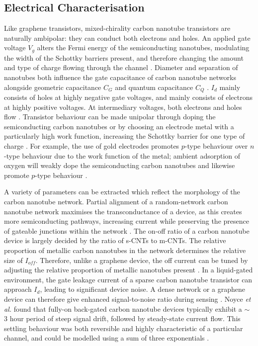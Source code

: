\documentclass[
  a4paper,
]{scrbook}
\begin{document}
\hypertarget{sec-electrical-characterisation-CNT}{%
\subsection{Electrical
Characterisation}\label{sec-electrical-characterisation-CNT}}

Like graphene transistors, mixed-chirality carbon nanotube transistors
are naturally ambipolar: they can conduct both electrons and holes. An
applied gate voltage \(V_g\) alters the Fermi energy of the
semiconducting nanotubes, modulating the width of the Schottky barriers
present, and therefore changing the amount and type of charge flowing
through the channel \autocite{Nakanishi2002,Kauffman2008,Heller2008}.
Diameter and separation of nanotubes both influence the gate capacitance
of carbon nanotube networks alongside geometric capacitance \(C_{G}\)
and quantum capacitance \(C_{Q}\) \autocite{Rouhi2011a}. \(I_d\) mainly
consists of holes at highly negative gate voltages, and mainly consists
of electrons at highly positive voltages. At intermediary voltages, both
electrons and holes flow \autocite{Avouris2007,Yao2021}. Transistor
behaviour can be made unipolar through doping the semiconducting carbon
nanotubes or by choosing an electrode metal with a particularly high
work function, increasing the Schottky barrier for one type of charge
\autocite{Avouris2007,Kauffman2008,Cao2009,Yao2021}. For example, the
use of gold electrodes promotes \(p\)-type behaviour over \(n\)-type
behaviour due to the work function of the metal; ambient adsorption of
oxygen will weakly dope the semiconducting carbon nanotubes and likewise
promote \(p\)-type behaviour
\autocite{McEuen2002,Kauffman2008,Cao2009,Shkodra2021}.

A variety of parameters can be extracted which reflect the morphology of
the carbon nanotube network. Partial alignment of a random-network
carbon nanotube network maximises the transconductance of a device, as
this creates more semiconducting pathways, increasing current while
preserving the presence of gateable junctions within the network
\autocite{Cao2009,Rouhi2010,Rouhi2011a,Jang2015,Li2023}. The on-off
ratio of a carbon nanotube device is largely decided by the ratio of
s-CNTs to m-CNTs. The relative proportion of metallic carbon nanotubes
in the network determines the relative size of \(I_{off}\). Therefore,
unlike a graphene device, the off current can be tuned by adjusting the
relative proportion of metallic nanotubes present
\autocite{Hu2004,Kauffman2008,Cao2009,Rouhi2011a}. In a liquid-gated
environment, the gate leakage current of a sparse carbon nanotube
transistor can approach \(I_d\), leading to significant device noise. A
dense network or a graphene device can therefore give enhanced
signal-to-noise ratio during sensing \autocite{Ohno2015}. Noyce \emph{et
al.} found that fully-on back-gated carbon nanotube devices typically
exhibit a \(\sim\) 3 hour period of steep signal drift, followed by
steady-state current flow. This settling behaviour was both reversible
and highly characteristic of a particular channel, and could be modelled
using a sum of three exponentials \autocite{Noyce2019}.
\end{document}
